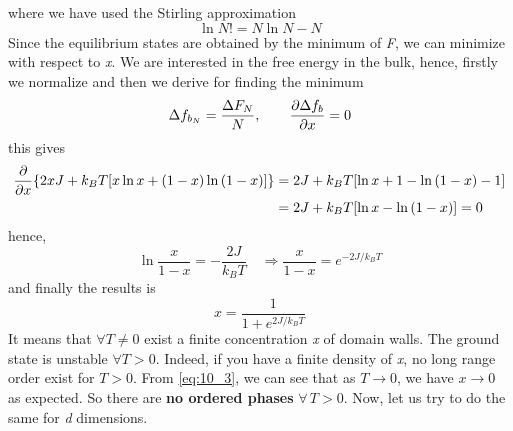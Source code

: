 \documentclass[../../Main/Main.tex]{subfiles}
\begin{document}
where we have used the Stirling approximation
\begin{equation*}
 \ln{N!} = N \ln{N} - N   
\end{equation*}
Since the equilibrium states are obtained by the minimum of \emph{F}, we can minimize with respect to \emph{x}. We are interested in the free energy in the bulk, hence, firstly we normalize and then we derive for finding the minimum
\begin{equation}
  \Delta f_{b_N} = \frac{\Delta F_N}{N}, \qquad \pdv{\Delta f_b}{x} = 0
\end{equation}
this gives 
\begin{equation*}
\begin{split}
  \pdv{}{x} \qty{ 2xJ +k_B T \qty[x \ln{x} + (1-x)\ln{(1-x)}  ] } &=  2J + k_B T \qty[\ln{x} +1 -\ln{(1-x)} -1 ]\\
  & = 2J + k_B T \qty[\ln{x}- \ln{(1-x)}  ] = 0
\end{split}
\end{equation*}
hence,
\begin{equation*}
  \ln{\frac{x}{1-x}} = -\frac{2J}{k_B T} \quad \Rightarrow \frac{x}{1-x} = e^{-2J/k_BT}
\end{equation*}
and finally the results is
\begin{equation}
 x = \frac{1}{1+e^{2J/k_BT} }
 \label{eq:10_3}
\end{equation}
It means that  \( \forall T \neq 0 \) exist a finite concentration \emph{x} of domain walls. The ground state is unstable \( \forall T>0 \). Indeed, if you have a finite density of \emph{x}, no long range order exist for \( T>0 \).  From \eqref{eq:10_3}, we can see that as \( T \rightarrow 0 \),  we have \( x \rightarrow 0\) as expected.
So there are \textbf{no ordered phases} $\forall \, T > 0$.
Now, let us try to do the same for \emph{d} dimensions.
\end{document}
